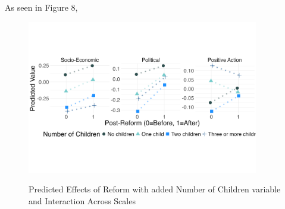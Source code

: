 \documentclass[12pt,letterpaper]{article}
\begin{document}
\begin{enumerate}
	\noindent As seen in Figure 8, 
	
	\begin{figure}[H]
		\centering
		\caption{Predicted Effects of Reform with added Number of Children variable and Interaction Across Scales}
		\vspace{-1cm}
		\includegraphics[width=0.9\textwidth]{children_plot}
		\label{fig:children_plot}
	\end{figure}
	

\end{enumerate}
\end{document}
